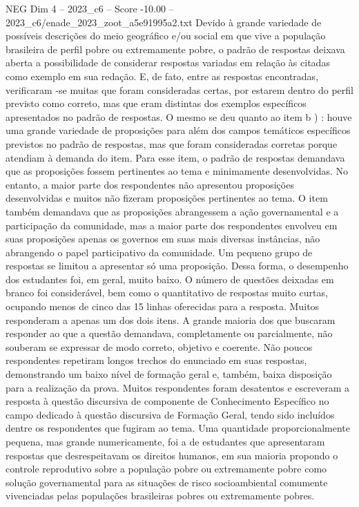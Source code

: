 \begin{textsample}{NEG Dim 4 – 2023\_c6 – Score -10.00 – 2023\_c6/enade\_2023\_zoot\_a5e91995a2.txt}
Devido à grande variedade de possíveis descrições do meio geográfico e/ou social em que vive a população brasileira de perfil pobre ou extremamente pobre, o padrão de respostas deixava aberta a possibilidade de considerar respostas variadas em relação às citadas como exemplo em sua redação.
E, de fato, entre as respostas encontradas, verificaram -se muitas que foram consideradas certas, por estarem dentro do perfil previsto como correto, mas que eram distintas dos exemplos específicos apresentados no padrão de respostas.
O mesmo se deu quanto ao item b ) : houve uma grande variedade de proposições para além dos campos temáticos específicos previstos no padrão de respostas, mas que foram consideradas corretas porque atendiam à demanda do item.
Para esse item, o padrão de respostas demandava que as proposições fossem pertinentes ao tema e minimamente desenvolvidas.
No entanto, a maior parte dos respondentes não apresentou proposições desenvolvidas e muitos não fizeram proposições pertinentes ao tema.
O item também demandava que as proposições abrangessem a ação governamental e a participação da comunidade, mas a maior parte dos respondentes envolveu em suas proposições apenas os governos em suas mais diversas instâncias, não abrangendo o papel participativo da comunidade.
Um pequeno grupo de respostas se limitou a apresentar só uma proposição.
Dessa forma, o desempenho dos estudantes foi, em geral, muito baixo.
O número de questões deixadas em branco foi considerável, bem como o quantitativo de respostas muito curtas, ocupando menos de cinco das 15 linhas oferecidas para a resposta.
Muitos responderam a apenas um dos dois itens.
A grande maioria dos que buscaram responder ao que a questão demandava, completamente ou parcialmente, não souberam se expressar de modo correto, objetivo e coerente.
Não poucos respondentes repetiram longos trechos do enunciado em suas respostas, demonstrando um baixo nível de formação geral e, também, baixa disposição para a realização da prova.
Muitos respondentes foram desatentos e escreveram a resposta à questão discursiva de componente de Conhecimento Específico no campo dedicado à questão discursiva de Formação Geral, tendo sido incluídos dentre os respondentes que fugiram ao tema.
Uma quantidade proporcionalmente pequena, mas grande numericamente, foi a de estudantes que apresentaram respostas que desrespeitavam os direitos humanos, em sua maioria propondo o controle reprodutivo sobre a população pobre ou extremamente pobre como solução governamental para as situações de risco socioambiental comumente vivenciadas pelas populações brasileiras pobres ou extremamente pobres.

\end{textsample}
